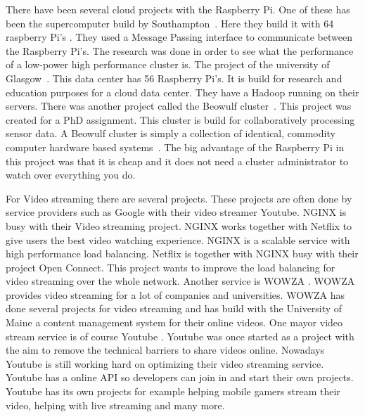 \documentclass{sig-alternate-br}
\begin{document}
There have been several cloud projects with the Raspberry Pi. \newline
One of these has been the supercomputer build by Southampton~\cite{cox:2014}. Here they build it with 64 raspberry Pi's . They used a Message Passing interface to communicate between the Raspberry Pi's. The research was done in order to see what the performance of a low-power high performance cluster is. \newline
The project of the university of Glasgow~\cite{tso:2013}. This data center has 56 Raspberry Pi's. It is build for research and education purposes for a cloud data center. They have a Hadoop running on their servers. \newline
There was another project called the Beowulf cluster~\cite{beowolf-setup}. This project was created for a PhD assignment. This cluster is build for collaboratively processing sensor data.  A Beowulf cluster is simply a collection of identical, commodity computer hardware based systems~\cite{beowolf-setup}. The big advantage of the Raspberry Pi in this project was that it is cheap and it does not need a cluster administrator to watch over everything you do. 

For Video streaming there are several projects. These projects are often done by service providers such as Google with their video streamer Youtube. \newline
NGINX is busy with their Video streaming project. NGINX works together with Netflix to give users the best video watching experience. NGINX is a scalable service with high performance load balancing.  Netflix is together with NGINX busy with their project Open Connect. This project wants to improve the load balancing for video streaming over the whole network. \newline
Another service is WOWZA \cite{wowza}. WOWZA provides video streaming for a lot of companies and universities. WOWZA has done several projects for video streaming and has build with the University of Maine a content management system for their online videos. 
One mayor video stream service is of course Youtube \cite{youtube}. Youtube was once started as a project with the aim to remove the technical barriers to share videos online. Nowadays Youtube is still working hard on optimizing their video streaming service. Youtube has a online API so developers can join in and start their own projects. Youtube has its own projects for example helping mobile gamers stream their video, helping with live streaming and many more.
\end{document}
